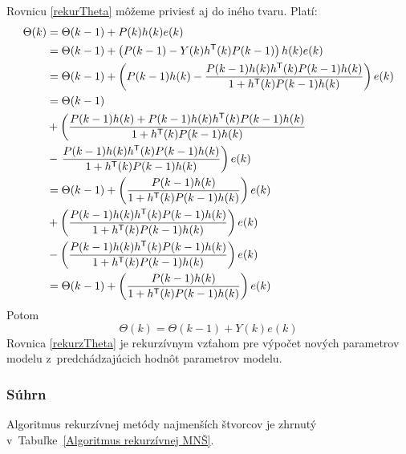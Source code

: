 \documentclass[a4paper, 10pt, ]{article}
\begin{document}
Rovnicu \eqref{rekurTheta} môžeme priviesť aj do iného tvaru. Platí:
\begin{equation} \label{velkaRovnicaDole}
	\begin{split}
		\Theta(k) &= \Theta(k-1) + P(k) h(k) e(k) \\
		&= \Theta(k-1) + \left( P(k-1) - Y(k) h^{\mathsf{T}}(k) P(k-1) \right) h(k) e(k) \\
		&= \Theta(k-1) + \left( P(k-1) h(k) - \frac {P(k-1) h(k) h^{\mathsf{T}}(k) P(k-1) h(k)}{ 1 + h^{\mathsf{T}}(k) P(k-1) h(k)} \right) e(k) \\
		&= \Theta(k-1)
			\\&+ \left( \frac{P(k-1) h(k) + P(k-1) h(k) h^{\mathsf{T}}(k) P(k-1) h(k)}{1 + h^{\mathsf{T}}(k) P(k-1) h(k)} \right.
			\\&- \left. \frac{P(k-1) h(k) h^{\mathsf{T}}(k) P(k-1) h(k)}{1 + h^{\mathsf{T}}(k) P(k-1) h(k)} \right) e(k) \\
		&= \Theta(k-1) + \left( \frac{P(k-1) h(k)}{1 + h^{\mathsf{T}}(k) P(k-1) h(k)} \right) e(k)
			\\&+ \left( \frac{P(k-1) h(k) h^{\mathsf{T}}(k) P(k-1) h(k)}{1 + h^{\mathsf{T}}(k) P(k-1) h(k)} \right) e(k)
			\\&- \left( \frac{P(k-1) h(k) h^{\mathsf{T}}(k) P(k-1) h(k)}{1 + h^{\mathsf{T}}(k) P(k-1) h(k)} \right) e(k) \\
		&= \Theta(k-1) + \left( \frac{P(k-1) h(k)}{1 + h^{\mathsf{T}}(k) P(k-1) h(k)} \right) e(k)
	\end{split}
\end{equation}
Potom
\begin{equation} \label{rekurzTheta}
	\Theta(k) = \Theta(k-1) + Y(k) e(k)
\end{equation}
Rovnica \eqref{rekurzTheta} je rekurzívnym vzťahom pre výpočet nových parametrov modelu z~predchádzajúcich hodnôt parametrov modelu.





\subsubsection{Súhrn}

Algoritmus rekurzívnej metódy najmenších štvorcov je zhrnutý v~Tabuľke~\ref{Algoritmus rekurzívnej MNŠ}.
\end{document}

